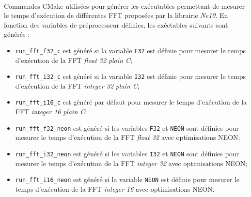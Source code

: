 \documentclass{article}
\begin{document}
\paragraph{}
Commandes CMake utilisées pour générer les exécutables permettant de mesurer le temps d'exécution de différentes FFT proposées par la librairie \emph{Ne10}. En fonction des variables de préprocesseur définies, les exéctables suivants sont générés :
\begin{itemize}
    \item \texttt{run\_fft\_f32\_c} est généré si la variable \texttt{F32} est définie pour mesurer le temps d'exécution de la FFT \emph{float 32} \emph{plain C};
    \item \texttt{run\_fft\_i32\_c} est généré si la variable \texttt{I32} est définie pour mesurer le temps d'exécution de la FFT \emph{integer 32} \emph{plain C};
    \item \texttt{run\_fft\_i16\_c} est généré par défaut pour mesurer le temps d'exécution de la FFT \emph{integer 16} \emph{plain C};
    \item \texttt{run\_fft\_f32\_neon} est généré si les variables \texttt{F32} et \texttt{NEON} sont définies pour mesurer le temps d'exécution de la FFT \emph{float 32} avec optimisations NEON;
    \item \texttt{run\_fft\_i32\_neon} est généré si les variables \texttt{I32} et \texttt{NEON} sont définies pour mesurer le temps d'exécution de la FFT \emph{integer 32} avec optimisations NEON;
    \item \texttt{run\_fft\_i16\_neon} est généré si la variable \texttt{NEON} est définie pour mesurer le temps d'exécution de la FFT \emph{integer 16} avec optimisations NEON.
\end{itemize}
\lstset{language=make}
\end{document}
